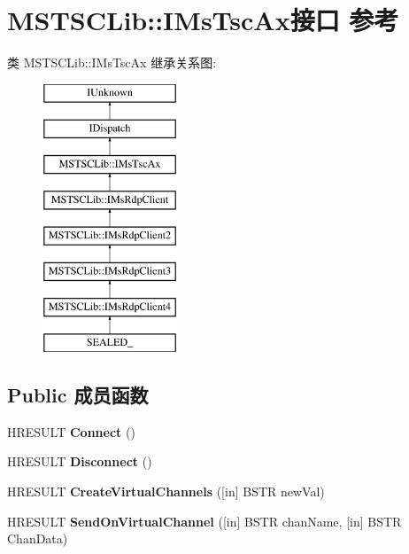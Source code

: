 \hypertarget{interface_m_s_t_s_c_lib_1_1_i_ms_tsc_ax}{}\section{M\+S\+T\+S\+C\+Lib\+:\+:I\+Ms\+Tsc\+Ax接口 参考}
\label{interface_m_s_t_s_c_lib_1_1_i_ms_tsc_ax}
类 M\+S\+T\+S\+C\+Lib\+:\+:I\+Ms\+Tsc\+Ax 继承关系图\+:\begin{figure}[H]
\begin{center}
\leavevmode
\includegraphics[height=8.000000cm]{interface_m_s_t_s_c_lib_1_1_i_ms_tsc_ax}
\end{center}
\end{figure}
\subsection*{Public 成员函数}
\begin{DoxyCompactItemize}
\item 
\mbox{\label{interface_m_s_t_s_c_lib_1_1_i_ms_tsc_ax_ab53d4645281a11883ea8389c6c631e4c}} 
H\+R\+E\+S\+U\+LT {\bfseries Connect} ()
\item 
\mbox{\label{interface_m_s_t_s_c_lib_1_1_i_ms_tsc_ax_af582430145090a88181cd9fee45dd7db}} 
H\+R\+E\+S\+U\+LT {\bfseries Disconnect} ()
\item 
\mbox{\label{interface_m_s_t_s_c_lib_1_1_i_ms_tsc_ax_acb5d13553a51475d36e7ad62737eba20}} 
H\+R\+E\+S\+U\+LT {\bfseries Create\+Virtual\+Channels} (\mbox{[}in\mbox{]} B\+S\+TR new\+Val)
\item 
\mbox{\label{interface_m_s_t_s_c_lib_1_1_i_ms_tsc_ax_aea6ffc4ed1787708a0e089378ab5a6cd}} 
H\+R\+E\+S\+U\+LT {\bfseries Send\+On\+Virtual\+Channel} (\mbox{[}in\mbox{]} B\+S\+TR chan\+Name, \mbox{[}in\mbox{]} B\+S\+TR Chan\+Data)
\end{DoxyCompactItemize}
